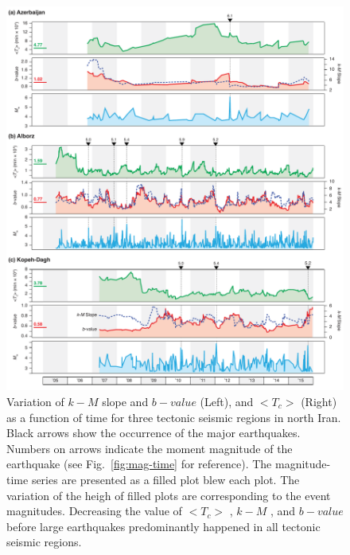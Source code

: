 \begin{figure}[t]
	\centering
	\includegraphics[width=\textwidth]{figures/pdf/figure-09} 
	\caption{ Variation of $k-M$ slope  and $b-value$ (Left), and $ < T_c >$ (Right) as a function of time for three tectonic seismic regions in north Iran. Black arrows show the occurrence of the major earthquakes. Numbers on arrows indicate the moment magnitude of the earthquake (see Fig.~\ref{fig:mag-time} for reference).  The magnitude-time series are presented as a filled plot blew each plot. The variation of the heigh of filled plots are corresponding to the event magnitudes. Decreasing the value of  $<T_c>$  ,  $k-M$ , and  $b-value$  before large earthquakes predominantly happened in all tectonic seismic regions.}
	\label{fig:tc}
\end{figure}
